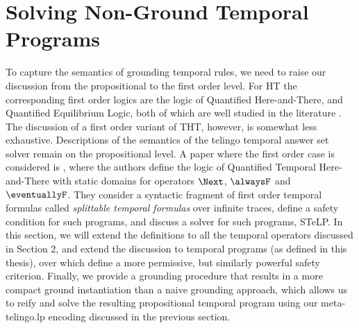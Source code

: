 \section{Solving Non-Ground Temporal Programs}

To capture the semantics of grounding temporal rules, we need to raise
our discussion from the propositional to the first order level. For HT
the corresponding first order logics are the logic of Quantified
Here-and-There, and Quantified Equilibrium Logic, both of which are
well studied in the literature \cite{peaval06a} \cite{peaval08a}. The
discussion of a first order variant of THT, however, is somewhat less
exhaustive. Descriptions of the semantics of the telingo temporal
answer set solver remain on the propositional level. A paper where the
first order case is considered is \cite{agcapevidi17a}, where the
authors define the logic of Quantified Temporal Here-and-There with
static domains for operators $\Next$, $\alwaysF$ and
$\eventuallyF$. They consider a syntactic fragment of first order
temporal formulas called \emph{splittable temporal formulas} over
infinite traces, define a safety condition for such programs, and
discuss a solver for such programs, STeLP. In this section, we will
extend the definitions to all the temporal operators discussed in
Section 2, and extend the discussion to temporal programs (as defined
in this thesis), over which define a more permissive, but similarly
powerful safety criterion. Finally, we provide a grounding procedure
that results in a more compact ground instantiation than a naive
grounding approach, which allows us to reify and solve the resulting
propositional temporal program using our meta-telingo.lp encoding
discussed in the previous section.




